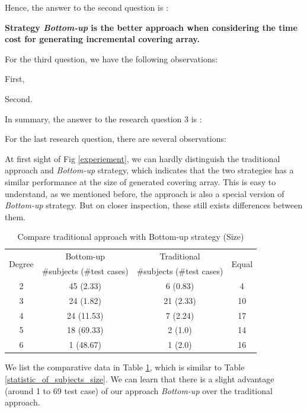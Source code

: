 \documentclass[conference]{IEEEtran}
\theoremstyle{definition}
\begin{document}
Hence, the answer to the second question is :

\textbf{Strategy \emph{Bottom-up} is the better approach when considering the time cost for generating incremental covering array. }



For the third question, we have the following observations:

First,

Second.

In summary, the answer to the research question 3 is :







For the last research question, there are several observations:

At first sight of Fig \ref{experiement}, we can hardly distinguish the traditional approach and \emph{Bottom-up} strategy, which indicates that the two strategies has a similar performance at the size of generated covering array. This is easy to understand, as we mentioned before, the approach \cite{fouche2009incremental} is also a special version of \emph{Bottom-up} strategy.
But on closer inspection, these still exists differences between them.

\begin{table}[!ht]
\caption{Compare traditional approach with Bottom-up strategy (Size)}
\label{statistic_of_subjects_size_tranditional}
\center
    \begin{tabular}{|c|c|c|c|} \hline
\multirow{2}{*}{Degree} & Bottom-up & Traditional & \multirow{2}{*}{Equal} \\\cline{2-3}
 & \#subjects (\#test cases) & \#subjects (\#test cases) &  \\\hline
2 & 45 (2.33) & 6 (0.83) & 4 \\
3 & 24 (1.82) & 21 (2.33) & 10 \\
4 & 24 (11.53) & 7 (2.24) & 17 \\
5 & 18 (69.33) & 2 (1.0) & 14 \\
6 & 1 (48.67) & 1 (2.0) & 16 \\ \hline
    \end{tabular}%
\end{table}

We list the comparative data in Table \ref{statistic_of_subjects_size_tranditional}, which is similar to Table \ref{statistic_of_subjects_size}. We can learn that there is a slight advantage (around 1 to 69 test case) of our approach \emph{Bottom-up} over the traditional approach.
\end{document}
